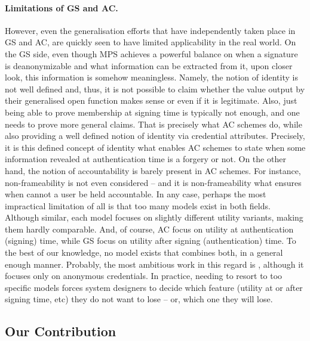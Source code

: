 \paragraph{Limitations of GS and AC.} %
However, even the generalisation efforts that have independently taken place in
GS and AC, are quickly seen to have limited applicability in the real world. On
the GS side, even though MPS achieves a powerful balance on when a signature is
deanonymizable and what information can be extracted from it, upon closer look,
this information is somehow meaningless. Namely, the notion of identity is not
well defined and, thus, it is not possible to claim whether the value output by
their generalised open function makes sense or even if it is legitimate. Also,
just being able to prove membership at signing time is typically not enough, and
one needs to prove more general claims. That is precisely what AC schemes do,
while also providing a well defined notion of identity via credential
attributes. Precisely, it is this defined concept of identity what enables AC
schemes to state when some information revealed at authentication time is a
forgery or not. On the other hand, the notion of accountability  is barely
present in AC schemes. For instance, non-frameability is not even considered
-- and it is non-frameability what ensures when cannot a user be held
accountable.
%
In any case, perhaps the most impractical limitation of all is that too many
models exist in both fields. Although similar, each model focuses on slightly
different utility variants, making them hardly comparable. And, of course, AC
focus on utility at authentication (signing) time, while GS focus on
utility after signing (authentication) time. To the best of our knowledge, no
model exists that combines both, in a general enough manner. Probably, the
most ambitious work in this regard is \cite{ckl+15}, although it focuses only on
anonymous credentials. In practice, needing to resort to too specific models
forces system designers to decide which feature (utility at or after signing
time, etc) they do not want to lose -- or, which one they will lose.

\subsection{Our Contribution} 

